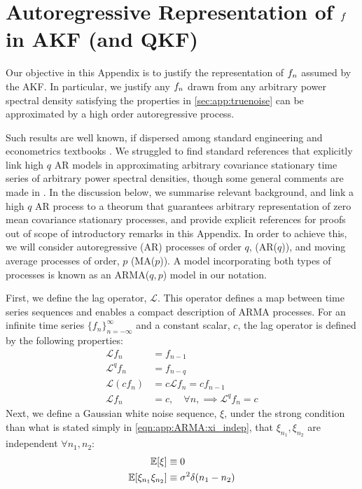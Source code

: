 \clearpage
\section{ Autoregressive Representation of $f$ in AKF (and QKF) \label{sec:app:AKF}}

Our objective in this Appendix is to justify the representation of $f_n$ assumed by the AKF. In particular, we justify any $f_n$ drawn from any arbitrary power spectral density satisfying the properties in \cref{sec:app:truenoise} can be approximated by a high order autoregressive process.

Such results are well known, if dispersed among standard engineering and econometrics textbooks \cite{hamilton1994time,brockwell1996introduction,west1996bayesian,harvey1990forecasting,landau1998adaptive,candy2016bayesian}. We struggled to find standard references that explicitly link high $q$ AR models in approximating arbitrary covariance stationary time series of arbitrary power spectral densities, though some general comments are made in \cite{west1996bayesian}. In the discussion below, we summarise relevant background, and link a high $q$ AR process to a theorum that guarantees arbitrary representation of zero mean covariance stationary processes, and provide explicit references for proofs out of scope of introductory remarks in this Appendix. In order to achieve this, we will consider autoregressive (AR) processes of order $q$, (AR($q$)), and  moving average processes of order, $p$ (MA($p$)). A model incorporating both types of processes is known as an ARMA($q,p$) model in our notation. 

First, we define the lag operator, $\mathcal{L}$. This operator defines a map between time series sequences and enables a compact description of ARMA processes. For an infinite time series $\{ f_n \}_{n = -\infty}^{\infty}$ and a constant scalar, $c$, the lag operator is defined by the following properties:
\begin{align}
\mathcal{L} f_n & = f_{n-1} \\
\mathcal{L}^q f_n & = f_{n-q} \\
\mathcal{L}(cf_n) & = c\mathcal{L}f_n = cf_{n-1}  \\
\mathcal{L}f_n & = c, \quad \forall n, \implies \mathcal{L}^q f_n  = c
\end{align}
Next, we define a Gaussian white noise sequence, $\xi$, under the strong condition than what is stated simply in \cref{eqn:app:ARMA:xi_indep}, that $\xi_{n_1}, \xi_{n_2}$ are independent $\forall n_1, n_2 $:
\begin{align}
\mathbb{E}[\xi] &\equiv 0  \\
\mathbb{E}[\xi_{n_1} \xi_{n_2}] &\equiv \sigma^2 \delta(n_1-n_2)\label{eqn:app:ARMA:xi_indep}   
\end{align}

